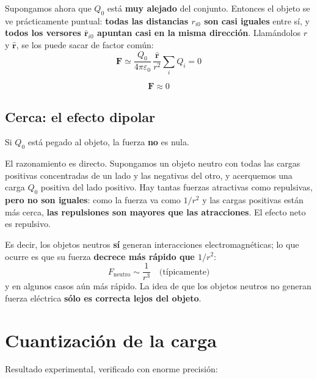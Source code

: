 \documentclass[12pt,a4paper]{article}
\begin{document}
Supongamos ahora que $Q_0$ está \textbf{muy alejado} del conjunto. Entonces el
objeto se ve prácticamente puntual: \textbf{todas las distancias $r_{i0}$ son casi
iguales} entre sí, y \textbf{todos los versores $\hat{\mathbf{r}}_{i0}$ apuntan
casi en la misma dirección}. Llamándolos $r$ y $\hat{\mathbf{r}}$, se los puede
sacar de factor común:
\[
\mathbf{F} \simeq \frac{Q_0}{4\pi\varepsilon_0}\,
\frac{\hat{\mathbf{r}}}{r^2}\sum_i Q_i = 0
\]

\begin{keybox}
\[
\boxed{\ \mathbf{F} \approx 0\ }
\]
\end{keybox}

\subsection{Cerca: el efecto dipolar}

\begin{warnbox}
Si $Q_0$ está pegado al objeto, la fuerza \textbf{no} es nula.
\end{warnbox}

El razonamiento es directo. Supongamos un objeto neutro con todas las cargas
positivas concentradas de un lado y las negativas del otro, y acerquemos una carga
$Q_0$ positiva del lado positivo. Hay tantas fuerzas atractivas como repulsivas,
\textbf{pero no son iguales}: como la fuerza va como $1/r^2$ y las cargas
positivas están más cerca, \textbf{las repulsiones son mayores que las
atracciones}. El efecto neto es repulsivo.

Es decir, los objetos neutros \textbf{sí} generan interacciones electromagnéticas;
lo que ocurre es que su fuerza \textbf{decrece más rápido que $1/r^2$}:
\[
\boxed{\ F_{\text{neutro}} \sim \frac{1}{r^3}
        \quad \text{(típicamente)}\ }
\]
y en algunos casos aún más rápido. La idea de que los objetos neutros no generan
fuerza eléctrica \textbf{sólo es correcta lejos del objeto}.



\section{Cuantización de la carga}

Resultado experimental, verificado con enorme precisión:
\end{document}
